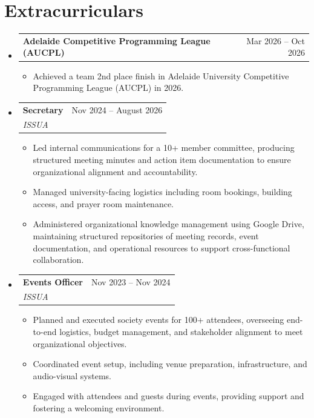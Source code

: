\documentclass[letterpaper,11pt]{article}
\makeatletter
\newcommand{\resumeItem}[1]{
  \item\small{
    {#1 \vspace{-2pt}}
  }
}
\newcommand{\resumeSubheading}[4]{
  \vspace{0pt}\item
    \begin{tabular*}{0.97\textwidth}[t]{l@{\extracolsep{\fill}}r}
      \textbf{#1} & #2 \\
      \textit{\small#3} %
    \end{tabular*} %
    \textit{\small #4}
    \vspace{-7pt}
}
\newcommand{\resumeProjectHeading}[2]{
    \item
    \begin{tabular*}{0.97\textwidth}{l@{\extracolsep{\fill}}r}
      \small#1 & #2 \\
    \end{tabular*}\vspace{-7pt}
}
\newcommand{\resumeSubHeadingListStart}{\begin{itemize}[leftmargin=0.10in, label={}]}
\newcommand{\resumeSubHeadingListEnd}{\end{itemize}}
\newcommand{\resumeItemListStart}{\begin{itemize}[leftmargin=0.14in]}
\newcommand{\resumeItemListEnd}{\end{itemize}\vspace{-8pt}}
\makeatother
\begin{document}
\section{Extracurriculars}
   \resumeSubHeadingListStart
        \resumeProjectHeading
         {\textbf{Adelaide Competitive Programming League (AUCPL)}}{\small Mar 2026 -- Oct 2026}
         \resumeItemListStart
           \resumeItem{Achieved a team 2nd place finish in Adelaide University Competitive Programming League (AUCPL) in 2026.}
         \resumeItemListEnd
         
    \resumeSubheading
    {Secretary}{\small Nov 2024 -- August 2026}
    {ISSUA}{}
    \resumeItemListStart
    \resumeItem{Led internal communications for a 10+ member committee, producing structured meeting minutes and action item documentation to ensure organizational alignment and accountability.}
    \resumeItem{Managed university-facing logistics including room bookings, building access, and prayer room maintenance.}
    \resumeItem{Administered organizational knowledge management using Google Drive, maintaining structured repositories of meeting records, event documentation, and operational resources to support cross-functional collaboration.}
    \resumeItemListEnd

    \resumeSubheading
    {Events Officer}{\small Nov 2023 -- Nov 2024}
    {ISSUA}{}
    \resumeItemListStart
    \resumeItem{Planned and executed society events for 100+ attendees, overseeing end-to-end logistics, budget management, and stakeholder alignment to meet organizational objectives.}
    \resumeItem{Coordinated event setup, including venue preparation, infrastructure, and audio-visual systems.}
    \resumeItem{Engaged with attendees and guests during events, providing support and fostering a welcoming environment.}
    \resumeItemListEnd

       \resumeSubHeadingListEnd

\end{document}
